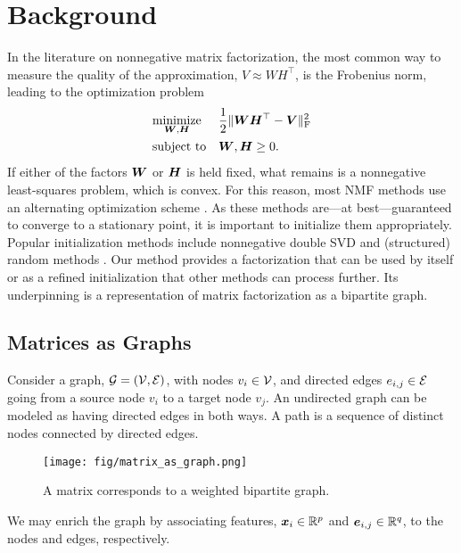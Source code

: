 \documentclass{article}
\begin{document}
\section{Background}
In the literature on nonnegative matrix factorization, the most common way to measure the quality of the approximation, $V\approx WH^\top $, is the Frobenius norm, %
leading to the optimization problem 
\begin{equation}
    \begin{aligned}
        & \underset{{\bm{W}}, {\bm{H}}}{\text{minimize}}
        & & \frac{1}{2}\|{\bm{W}}{\bm{H}}^\top   - {\bm{V}}\|_\text{F}^2 \\
        & \text{subject to}
        & & {\bm{W}}, {\bm{H}} \geq 0.
    \end{aligned}\label{eq:standardNMF}
\end{equation}
If either of the factors ${\bm{W}}$ or ${\bm{H}}$ is held fixed, what remains is a nonnegative least-squares problem, which is convex. %
For this reason, most NMF methods use an alternating optimization scheme \citep{Lee2001, Xu2013, Gillis2020}. As these methods are---at best---guaranteed to converge to a stationary point, it is important to initialize them appropriately. Popular initialization methods include nonnegative double SVD \citep{Boutsidis2008} and (structured) random methods \citep{Albright2006}. Our method provides a factorization that can be used by itself or as a refined initialization that other methods can process further. Its underpinning is a representation of matrix factorization as a bipartite graph. 

\subsection{Matrices as Graphs}
Consider a graph, ${\mathcal{G}} = ({\mathcal{V}}, {\mathcal{E}})$, with nodes $v_i\in{\mathcal{V}}$, and directed edges $e_{i,j}\in{\mathcal{E}}$ going from a source node $v_i$ to a target node $v_j$. An undirected graph can be modeled as having directed edges in both ways. A path is a sequence of distinct nodes connected by directed edges.
\begin{figure}[ht]
    \centering
    \texttt{[image: fig/matrix\_as\_graph.png]}
    \caption{A matrix corresponds to a weighted bipartite graph.}
    \label{fig:matrix2graph}
\end{figure}
We may enrich the graph by associating features, ${\bm{x}}_i\in\mathbb{R}^p$ and ${\bm{e}}_{i,j}\in\mathbb{R}^q$, to the nodes and edges, respectively. 
\end{document}
